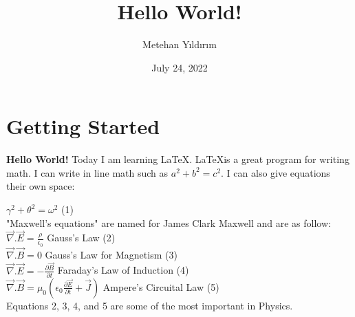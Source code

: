 \documentclass{article}
\title{Hello World!}
\author{Metehan Yıldırım}
\date{July 24, 2022}
\begin{document}
\maketitle

\section{Getting Started}

\textbf{Hello World!} Today I am learning \LaTeX . \LaTeX  is a great program for writing math. I can write in line math such as \(a^2 + b^2 = c^2\). I can also give equations their own space:

\hfill \( \gamma^2 + \theta^2 = \omega^2 \) \hfill (1) \\

"Maxwell's equations" are named for James Clark Maxwell and are as follow: \\

\hspace{50}
$\vec{\nabla}.\vec{E} = \frac{\rho}{\epsilon_0}$ \hfill Gauss's Law \hspace{70} (2) \\


\hspace{50}
$\vec{\nabla}.\vec{B} = 0$ \hfill Gauss's Law for Magnetism \hspace{3} (3) \\

\hspace{50}
$\vec{\nabla}.\vec{E} = -\frac{\partial\vec{B}}{\partial{t}}$ \hfill Faraday's Law of Induction \hspace{4} (4) \\

\hspace{50}
$\vec{\nabla}.\vec{B} =  \mu_0\left(\epsilon_0\frac{\partial\vec{E}}{\partial{t}}+\vec{J}\right)$ \hfill Ampere's Circuital Law \hspace{20} (5) \\

Equations 2, 3, 4, and 5 are some of the most important in Physics.
\end{document}
